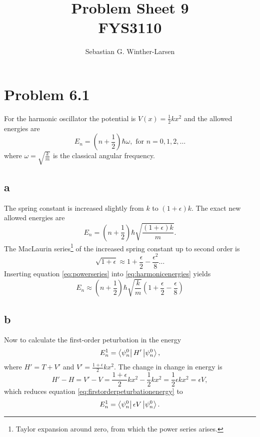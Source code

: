 \documentclass[11pt]{amsart}
\title[Problem Sheet 9]{Problem Sheet 9\\
		\large{FYS3110}}
\author[Winther-Larsen]{Sebastian G. Winther-Larsen}
\begin{document}
\maketitle

\section*{Problem 6.1}

For the harmonic oscillator the potential is $V(x) = \frac{1}{2}kx^2$ and the allowed energies are
\begin{equation}
E_n = \left(n + \frac{1}{2} \right)\hbar \omega, \text{ for } n = 0,1,2,\dots
\end{equation}
where $\omega = \sqrt{\frac{k}{m}}$ is the classical angular frequency. 

\subsection*{a}
The spring constant is increased slightly from $k$ to $(1+\epsilon)k$. The exact new allowed energies are
\begin{equation}
\label{eq:harmonicenergies}
E_n = \left(n + \frac{1}{2} \right)\hbar\sqrt{\frac{(1+\epsilon)k}{m}}.
\end{equation}
The MacLaurin series\footnote{Taylor expansion around zero, from which the power series arises.} of the increased spring constant up to second order is
\begin{equation}
\label{eq:powerseries}
\sqrt{1+\epsilon} \approx 1 + \frac{\epsilon}{2} - \frac{\epsilon^2}{8} \dots
\end{equation}
Inserting equation \ref{eq:powerseries} into \ref{eq:harmonicenergies} yields
\begin{equation}
E_n \approx \left(n + \frac{1}{2} \right)\hbar\sqrt{\frac{k}{m}}\left(1 + \frac{\epsilon}{2} - \frac{\epsilon}{8}\right) 
\end{equation}

\subsection*{b}
Now to calculate the first-order peturbation in the energy
\begin{equation}
\label{eq:firstorderpeturbationenergy}
E_n^1 = \bra{\psi_n^0}H'\ket{\psi_n^0},
\end{equation}
where $H' = T + V'$ and $V' = \frac{1+\epsilon}{2}kx^2$. The change in change in energy is
\begin{equation*}
H' - H = V' - V = \frac{1+\epsilon}{2}kx^2 - \frac{1}{2}kx^2 = \frac{1}{2}\epsilon kx^2 = \epsilon V, 
\end{equation*}
which reduces equation \ref{eq:firstorderpeturbationenergy} to
\begin{equation}
\label{eq:firstorderpeturbationenergy1}
E_n^1 = \bra{\psi_n^0}\epsilon V \ket{\psi_n^0}.
\end{equation}
\end{document}
